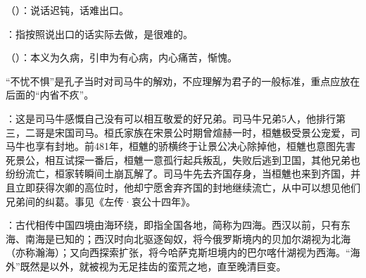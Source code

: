 {
\item {}（）：说话迟钝，话难出口。
\item {}：指按照说出口的话实际去做，是很难的。
}
{}


{
\item {}（）：本义为久病，引申为有心病，内心痛苦，惭愧。

“不忧不惧”是孔子当时对司马牛的解劝，不应理解为君子的一般标准，重点应放在后面的“内省不疚”。
}
{}


{
\item {}：这是司马牛感慨自己没有可以相互敬爱的好兄弟。司马牛兄弟5人，他排行第三，二哥是宋国司马。桓氏家族在宋景公时期曾煊赫一时，桓魋极受景公宠爱，司马牛也享有封地。前481年，桓魋的骄横终于让景公决心除掉他，桓魋也意图先害死景公，相互试探一番后，桓魋一意孤行起兵叛乱，失败后逃到卫国，其他兄弟也纷纷流亡，桓家转瞬间土崩瓦解了。司马牛先去齐国存身，当桓魋也来到齐国，并且立即获得次卿的高位时，他却宁愿舍弃齐国的封地继续流亡，从中可以想见他们兄弟间的纠葛。事见《左传·哀公十四年》。

\item {}：古代相传中国四境由海环绕，即指全国各地，简称为四海。西汉以前，只有东海、南海是已知的；西汉时向北驱逐匈奴，将今俄罗斯境内的贝加尔湖视为北海（亦称瀚海）；又向西探索扩张，将今哈萨克斯坦境内的巴尔喀什湖视为西海。“海外”既然是以外，就被视为无足挂齿的蛮荒之地，直至晚清巨变。
}
{}


